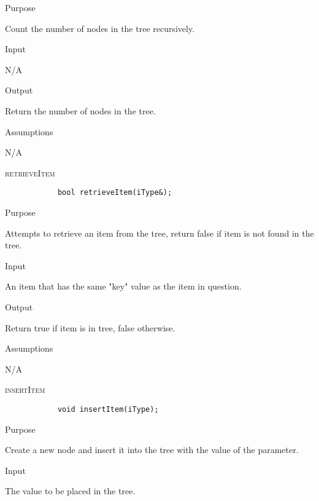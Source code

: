 \documentclass[pdftex, 12pt]{article}
\begin{document}
\begin{description}
\begin{description}
			\item{Purpose}

				Count the number of nodes in the tree recursively.

			\item{Input}

				N/A

			\item{Output}

				Return the number of nodes in the tree.

			\item{Assumptions}

				N/A

		\end{description}
	\item{\textsc{retrieveItem}}
		\begin{lstlisting}
			bool retrieveItem(iType&);
		\end{lstlisting}
		\begin{description}

			\item{Purpose}

				Attempts to retrieve an item from the tree, return false if item is not found in the tree.

			\item{Input}

				An item that has the same "key" value as the item in question.

			\item{Output}

				Return true if item is in tree, false otherwise.

			\item{Assumptions}

				N/A

		\end{description}
	\item{\textsc{insertItem}}
		\begin{lstlisting}
			void insertItem(iType);
		\end{lstlisting}
		\begin{description}

			\item{Purpose}

				Create a new node and insert it into the tree with the value of the parameter.

			\item{Input}

				The value to be placed in the tree.


\end{description}
\end{description}
\end{document}
